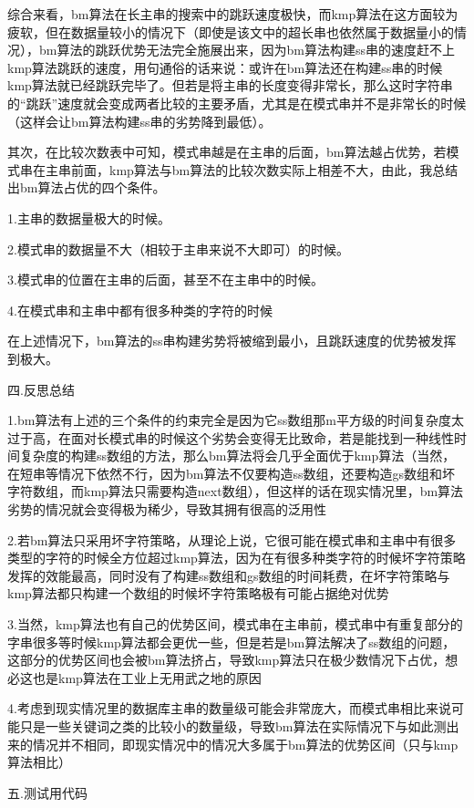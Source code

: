 \documentclass[12pt]{article}
\begin{document}
综合来看，bm算法在长主串的搜索中的跳跃速度极快，而kmp算法在这方面较为疲软，但在数据量较小的情况下（即使是该文中的超长串也依然属于数据量小的情况），bm算法的跳跃优势无法完全施展出来，因为bm算法构建ss串的速度赶不上kmp算法跳跃的速度，用句通俗的话来说：或许在bm算法还在构建ss串的时候kmp算法就已经跳跃完毕了。但若是将主串的长度变得非常长，那么这时字符串的“跳跃”速度就会变成两者比较的主要矛盾，尤其是在模式串并不是非常长的时候（这样会让bm算法构建ss串的劣势降到最低）。

其次，在比较次数表中可知，模式串越是在主串的后面，bm算法越占优势，若模式串在主串前面，kmp算法与bm算法的比较次数实际上相差不大，由此，我总结出bm算法占优的四个条件。

1.主串的数据量极大的时候。

2.模式串的数据量不大（相较于主串来说不大即可）的时候。

3.模式串的位置在主串的后面，甚至不在主串中的时候。

4.在模式串和主串中都有很多种类的字符的时候

在上述情况下，bm算法的ss串构建劣势将被缩到最小，且跳跃速度的优势被发挥到极大。

\begin{large}
	\noindent
	\heiti
	四.反思总结
\end{large}

1.bm算法有上述的三个条件的约束完全是因为它ss数组那m平方级的时间复杂度太过于高，在面对长模式串的时候这个劣势会变得无比致命，若是能找到一种线性时间复杂度的构建ss数组的方法，那么bm算法将会几乎全面优于kmp算法（当然，在短串等情况下依然不行，因为bm算法不仅要构造ss数组，还要构造gs数组和坏字符数组，而kmp算法只需要构造next数组），但这样的话在现实情况里，bm算法劣势的情况就会变得极为稀少，导致其拥有很高的泛用性

2.若bm算法只采用坏字符策略，从理论上说，它很可能在模式串和主串中有很多类型的字符的时候全方位超过kmp算法，因为在有很多种类字符的时候坏字符策略发挥的效能最高，同时没有了构建ss数组和gs数组的时间耗费，在坏字符策略与kmp算法都只构建一个数组的时候坏字符策略极有可能占据绝对优势

3.当然，kmp算法也有自己的优势区间，模式串在主串前，模式串中有重复部分的字串很多等时候kmp算法都会更优一些，但是若是bm算法解决了ss数组的问题，这部分的优势区间也会被bm算法挤占，导致kmp算法只在极少数情况下占优，想必这也是kmp算法在工业上无用武之地的原因

4.考虑到现实情况里的数据库主串的数量级可能会非常庞大，而模式串相比来说可能只是一些关键词之类的比较小的数量级，导致bm算法在实际情况下与如此测出来的情况并不相同，即现实情况中的情况大多属于bm算法的优势区间（只与kmp算法相比）

\begin{large}
	\noindent
	\heiti
	五.测试用代码
\end{large}
\end{document}
